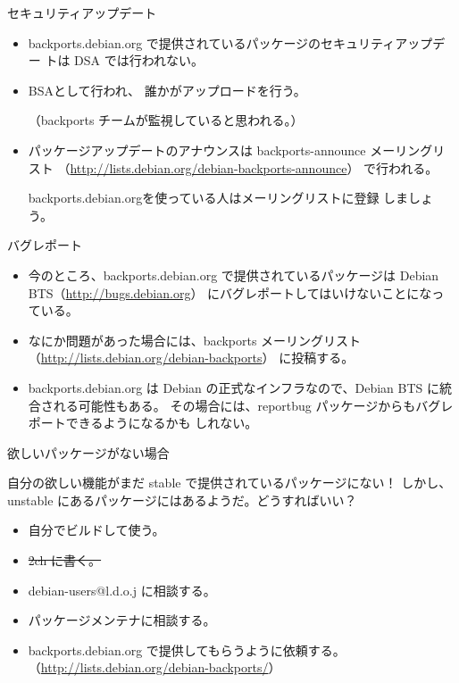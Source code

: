 \begin{frame}[containsverbatim]{セキュリティアップデート}
\begin{itemize}
\item backports.debian.org で提供されているパッケージのセキュリティアップデー
トは DSA では行われない。
\item BSAとして行われ、 誰かがアップロードを行う。

（backports チームが監視していると思われる。）

\item パッケージアップデートのアナウンスは
backports-announce メーリングリスト
（\url{http://lists.debian.org/debian-backports-announce}）
で行われる。

backports.debian.orgを使っている人はメーリングリストに登録
しましょう。
\end{itemize}

\end{frame}


\begin{frame}[containsverbatim]{バグレポート}
\begin{itemize}
\item 今のところ、backports.debian.org で提供されているパッケージは Debian
BTS（\url{http://bugs.debian.org}） にバグレポートしてはいけないことになっ
      ている。
\item なにか問題があった場合には、backports メーリングリスト（\url{http://lists.debian.org/debian-backports}）
に投稿する。

\item backports.debian.org は Debian の正式なインフラなので、Debian BTS
      に統合される可能性もある。
その場合には、reportbug パッケージからもバグレポートできるようになるかも
しれない。
\end{itemize}

\end{frame}


\begin{frame}{欲しいパッケージがない場合}

自分の欲しい機能がまだ stable で提供されているパッケージにない！
しかし、unstable にあるパッケージにはあるようだ。どうすればいい？


\begin{itemize}[<+->]
\item 自分でビルドして使う。
\item \sout{2ch に書く。}
\item debian-users@l.d.o.j に相談する。
\item パッケージメンテナに相談する。
\item backports.debian.org で提供してもらうように依頼する。
（\url{http://lists.debian.org/debian-backports/}）
\end{itemize}

\end{frame}

